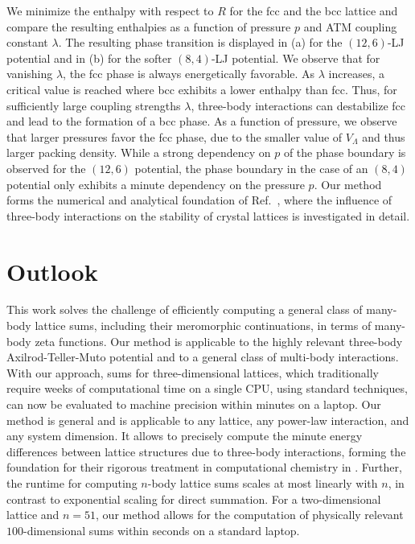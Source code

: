 \documentclass[]{amsart}
\numberwithin{mythm}{section}
\begin{document}
We minimize the enthalpy with respect to $R$ for the fcc and the bcc lattice and compare the resulting enthalpies as a function of pressure $p$ and ATM coupling constant $\lambda$. The resulting phase transition is displayed in  (a) for the $(12,6)$-LJ potential and in (b) for the softer $(8,4)$-LJ potential. We observe that for vanishing $\lambda$, the fcc phase is always energetically favorable. As $\lambda$ increases, a critical value is reached where bcc exhibits a lower enthalpy than fcc. Thus, for sufficiently large coupling strengths $\lambda$, three-body interactions can destabilize fcc and lead to the formation of a bcc phase. As a function of pressure, we observe that larger pressures favor the fcc phase, due to the smaller value of $V_\Lambda$ and thus larger packing density. While a strong dependency on $p$ of the phase boundary is observed for the $(12,6)$ potential, the phase boundary in the case of an $(8,4)$ potential only exhibits a minute dependency on the pressure $p$. Our method forms the numerical and analytical foundation of Ref.~\cite{roblesnavarro2025exact}, where the influence of three-body interactions on the stability of crystal lattices is investigated in detail.

\section{Outlook}
\label{sec:outlook}

This work solves the challenge of efficiently computing a general class of many-body lattice sums, including their meromorphic continuations, in terms of many-body zeta functions. Our method is applicable to the highly relevant three-body Axilrod-Teller-Muto potential and to a general class of multi-body interactions.  With our approach, sums for three-dimensional lattices, which traditionally require weeks of computational time on a single CPU, using standard techniques, can now be evaluated to machine precision within minutes on a laptop. Our method is general and is applicable to any lattice, any power-law interaction, and any system dimension. It allows to precisely compute the minute energy differences between lattice structures due to three-body interactions, forming the foundation for their rigorous treatment in computational chemistry in \cite{roblesnavarro2025exact}. Further, the runtime for computing $n$-body lattice sums scales at most linearly with $n$, in contrast to exponential scaling for direct summation. For a two-dimensional lattice and $n=51$, our method allows for the computation of physically relevant $100$-dimensional sums within seconds on a standard laptop. 
\end{document}
